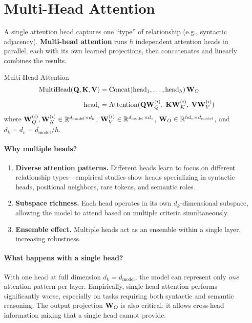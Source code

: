 \section{Multi-Head Attention}
\label{sec:multi-head}

A single attention head captures one ``type'' of relationship (e.g., syntactic
adjacency).  \textbf{Multi-head attention} runs $h$ independent attention heads
in parallel, each with its own learned projections, then concatenates and
linearly combines the results.

\begin{mathresult}{Multi-Head Attention}
\begin{align*}
    \text{MultiHead}(\mathbf{Q}, \mathbf{K}, \mathbf{V}) &= \text{Concat}(\text{head}_1, \ldots, \text{head}_h)\,\mathbf{W}_O \\[4pt]
    \text{head}_i &= \text{Attention}(\mathbf{Q}\mathbf{W}_Q^{(i)},\; \mathbf{K}\mathbf{W}_K^{(i)},\; \mathbf{V}\mathbf{W}_V^{(i)})
\end{align*}
where $\mathbf{W}_Q^{(i)}, \mathbf{W}_K^{(i)} \in \mathbb{R}^{d_{\text{model}} \times d_k}$,\;
$\mathbf{W}_V^{(i)} \in \mathbb{R}^{d_{\text{model}} \times d_v}$,\;
$\mathbf{W}_O \in \mathbb{R}^{hd_v \times d_{\text{model}}}$, and
$d_k = d_v = d_{\text{model}} / h$.
\end{mathresult}

\paragraph{Why multiple heads?}
\begin{enumerate}
    \item \textbf{Diverse attention patterns.}  Different heads learn to focus
          on different relationship types---empirical studies show heads
          specializing in syntactic heads, positional neighbors, rare tokens,
          and semantic roles.
    \item \textbf{Subspace richness.}  Each head operates in its own
          $d_k$-dimensional subspace, allowing the model to attend based on
          multiple criteria simultaneously.
    \item \textbf{Ensemble effect.}  Multiple heads act as an ensemble within
          a single layer, increasing robustness.
\end{enumerate}

\paragraph{What happens with a single head?}
With one head at full dimension $d_k = d_{\text{model}}$, the model can
represent only \emph{one} attention pattern per layer.  Empirically,
single-head attention performs significantly worse, especially on tasks
requiring both syntactic and semantic reasoning.  The output projection
$\mathbf{W}_O$ is also critical: it allows cross-head information mixing that a
single head cannot provide.


